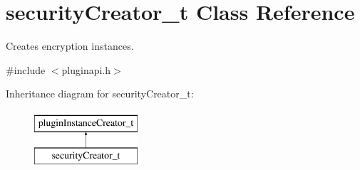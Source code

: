 \hypertarget{classsecurityCreator__t}{\section{security\-Creator\-\_\-t \-Class \-Reference}
\label{classsecurityCreator__t}
}


\-Creates encryption instances.  




{\ttfamily \#include $<$pluginapi.\-h$>$}

\-Inheritance diagram for security\-Creator\-\_\-t\-:\begin{figure}[H]
\begin{center}
\leavevmode
\includegraphics[height=2.000000cm]{classsecurityCreator__t}
\end{center}
\end{figure}
